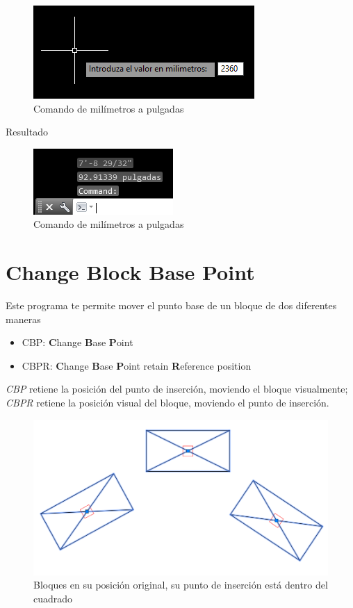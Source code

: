 \documentclass[12pt,letterpaper,final]{report}
\begin{document}
\begin{figure}[H]
	\centering
	\includegraphics[width=0.65\linewidth, height=0.5\textheight,keepaspectratio]{Imagenes/autocad_mmapulgadas_02}
	\caption{Comando de milímetros a pulgadas}
	\label{fig:autocadmmapulgadas02}
\end{figure}

{\LARGE Resultado}

\begin{figure}[H]
	\centering
	\includegraphics[width=0.65\linewidth, height=0.5\textheight,keepaspectratio]{Imagenes/autocad_mmapulgadas_03}
	\caption{Comando de milímetros a pulgadas}
	\label{fig:autocadmmapulgadas03}
\end{figure}


\section{Change Block Base Point}

Este programa te permite mover el punto base de un bloque de dos diferentes maneras

\begin{itemize}
	\item CBP: \textbf{C}hange \textbf{B}ase \textbf{P}oint
	\item CBPR: \textbf{C}hange \textbf{B}ase \textbf{P}oint retain \textbf{R}eference position
\end{itemize}

\emph{CBP} retiene la posición del punto de inserción, moviendo el bloque visualmente; \emph{CBPR} retiene la posición visual del bloque, moviendo el punto de inserción.

\begin{figure}[H]
	\centering
	\includegraphics[width=0.7\linewidth]{Imagenes/autocad_cbp_01}
	\caption{Bloques en su posición original, su punto de inserción está dentro del cuadrado}
	\label{fig:autocadcbp01}
\end{figure}
\end{document}
